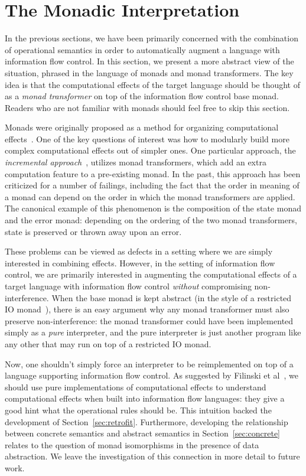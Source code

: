 \section{The Monadic Interpretation}
\label{sec:monad}

In the previous sections, we have been primarily concerned with the
combination of operational semantics in order to automatically augment a
language with information flow control.  In this section, we present
a more abstract view of the situation, phrased in the language of monads
and monad transformers.  The key idea is that the computational effects
of the target language should be thought of as a \emph{monad transformer}
on top of the information flow control base monad.  Readers who are not
familiar with monads should feel free to skip this section.

Monads were originally proposed as a method for organizing computational
effects~\cite{Moggi:1991:NCM:116981.116984}.  One of the key questions
of interest was how to modularly build more complex computational
effects out of simpler ones.  One particular approach, the
\emph{incremental
approach}~\cite{Benton00monadsand,Liang95monadtransformers}, utilizes
monad transformers, which add an extra computation feature to a
pre-existing monad.  In the past, this approach has been criticized for
a number of failings, including the fact that the order in meaning of a
monad can depend on the order in which the monad transformers are
applied. The canonical example of this phenomenon is the
composition of the state monad and the error monad: depending on the
ordering of the two monad transformers, state is preserved or thrown away
upon an error.

These problems can be viewed as defects in a setting where we are
simply interested in combining effects.  However, in the setting of information
flow control, we are primarily interested in augmenting the
computational effects of a target language with information flow control
\emph{without} compromising non-interference.  When the base monad is
kept abstract (in the style of a restricted IO monad~\cite{Terei:2012:SH:2364506.2364524}),
there is an easy argument why any monad transformer must also preserve non-interference:
the monad transformer could have been implemented simply as a \emph{pure} interpreter, and
the pure interpreter is just another program like any other that may run on top of
a restricted IO monad.

Now, one shouldn't simply force an interpreter to be reimplemented on
top of a language supporting information flow control.  As suggested by
Filinski et al~\cite{Filinski:2010:MA:1707801.1706354}, we should use
pure implementations of computational effects to understand
computational effects when built into information flow languages: they
give a good hint what the operational rules should be.  This intuition
backed the development of Section~\ref{sec:retrofit}.  Furthermore,
developing the relationship between concrete semantics and abstract
semantics in Section~\ref{sec:concrete} relates to the question of monad
isomorphisms in the presence of data abstraction.  We leave the
investigation of this connection in more detail to future work.
